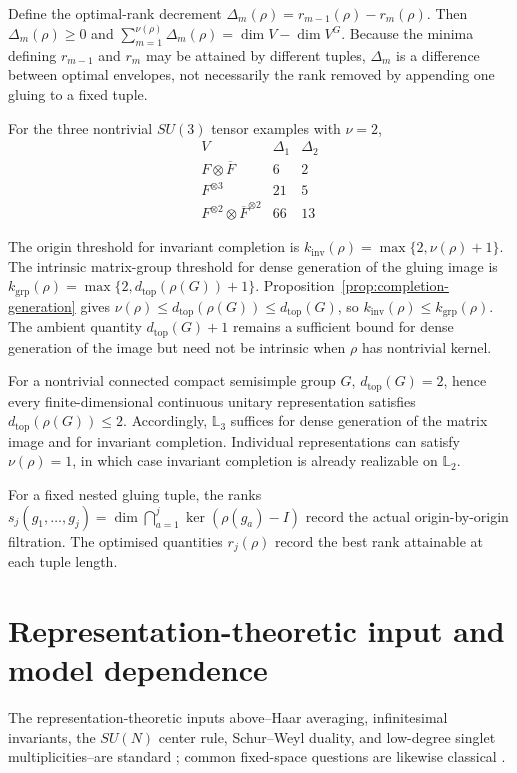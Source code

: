 \documentclass[11pt]{article}
\theoremstyle{plain}
\theoremstyle{definition}
\newcommand{\Ltwo}{\mathbb{L}_{2}}
\begin{document}
Define the optimal-rank decrement
\(\Delta_m(\rho) = r_{m-1}(\rho)-r_m(\rho)\).
Then \(\Delta_m(\rho)\geq0\) and
\(\sum_{m=1}^{\nu(\rho)}\Delta_m(\rho) = \dim V-\dim V^G\).
Because the minima defining \(r_{m-1}\) and \(r_m\) may be attained by different tuples, \(\Delta_m\) is a difference between optimal envelopes, not necessarily the rank removed by appending one gluing to a fixed tuple.

For the three nontrivial \(SU(3)\) tensor examples with \(\nu=2\),
\[
\begin{array}{c|c|c}
V & \Delta_1 & \Delta_2\\
\hline
F\otimes\overline F & 6 & 2\\
F^{\otimes3} & 21 & 5\\
F^{\otimes2}\otimes\overline F^{\otimes2} & 66 & 13
\end{array}
\]

The origin threshold for invariant completion is
\(k_{\mathrm{inv}}(\rho) = \max\{2,\nu(\rho)+1\}\).
The intrinsic matrix-group threshold for dense generation of the gluing
image is
\(k_{\mathrm{grp}}(\rho) = \max\{2,d_{\mathrm{top}}(\rho(G))+1\}\).
Proposition~\ref{prop:completion-generation} gives
\(\nu(\rho) \leq d_{\mathrm{top}}(\rho(G)) \leq d_{\mathrm{top}}(G)\),
so
\(k_{\mathrm{inv}}(\rho) \leq k_{\mathrm{grp}}(\rho)\).
The ambient quantity \(d_{\mathrm{top}}(G)+1\) remains a sufficient bound
for dense generation of the image but need not be intrinsic when
\(\rho\) has nontrivial kernel.

For a nontrivial connected compact semisimple group \(G\),
\(d_{\mathrm{top}}(G)=2\),
hence every finite-dimensional continuous unitary representation satisfies
\(d_{\mathrm{top}}(\rho(G))\leq2\).
Accordingly, \(\mathbb L_3\) suffices for dense generation of the matrix image and
for invariant completion. Individual representations can satisfy
\(\nu(\rho)=1\), in which case invariant completion is already realizable
on \(\Ltwo\).

For a fixed nested gluing tuple, the ranks \(s_j(g_1,\ldots,g_j) = \dim\bigcap_{a=1}^{j}\ker(\rho(g_a)-I)\) record the actual origin-by-origin filtration. The optimised quantities \(r_j(\rho)\) record the best rank attainable at each tuple length.
\section{Representation-theoretic input and model dependence}
\label{sec:unitary-scope}

The representation-theoretic inputs above--Haar averaging, infinitesimal invariants, the \(SU(N)\) center rule, Schur--Weyl duality, and low-degree singlet multiplicities--are standard \citep{Hall2015,BrockerTomDieck1985,Weyl1997ClassicalGroups,FultonHarris1991,GoodmanWallach2009,Howe1989ClassicalInvariantTheory}; common fixed-space questions are likewise classical \citep{BernikEtAl2005CommonFixed}.
\end{document}
